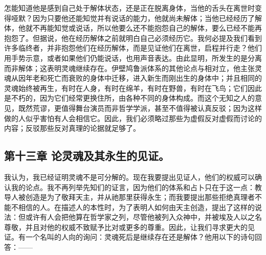 怎能知道他是感到自己处于解体状态，还是正在脱离身体，当他的舌头在离世时变得哑默？因为只要他还能知觉并有说话的能力，他就尚未解体；当他已经经历了解体，他就不再能知觉或说话，所以他要么还不能抱怨自己的解体，要么已经不能再抱怨了。但据说，他在经历解体之前就明白自己必须经历它。我何必提及我们看到许多临终者，并非抱怨他们在经历解体，而是见证他们在离世，启程并行走？他们用手势示意，或者如果他们仍能说话，也用声音表达。由此显明，所发生的是分离而非解体；这表明灵魂继续存在。伊壁鸠鲁派体系的其他论点与相对立，他主张灵魂从因年老和死亡而衰败的身体中迁移，进入新生而刚出生的身体中；并且相同的灵魂始终被再生，有时在人身，有时在绵羊，有时在野兽，有时在飞鸟；它们因此是不朽的，因为它们经常更换住所，由各种不同的身体构成。而这个无知之人的意见，既然荒谬，更值得舞台演员而非哲学学派，甚至不值得被认真反驳；因为这样做的人似乎害怕有人会相信它。因此，我们必须略过那些为虚假反对虚假而讨论的内容；反驳那些反对真理的论据就足够了。\par


\subsection{第十三章 论灵魂及其永生的见证。}

我认为，我已经证明灵魂不是可分解的。现在我要提出见证人，他们的权威可以确认我的论点。我不再列举先知们的证言，因为他们的体系和占卜只在于这一点：教导人被创造是为了敬拜天主，并从祂那里获得永生；而我要提出那些拒绝真理者不能不相信的人。在描述人的本性时，为了表明人如何由天主创造，提出了这样的说法：但或许有人会把他算在哲学家之列，尽管他被列入众神中，并被埃及人以之名尊敬，并且对他的权威不致赋予比对或更多的尊重。因此，让我们寻求更大的见证。有一个名叫的人向的询问：灵魂死后是继续存在还是解体？他用以下的诗句回答：——\par

\par

